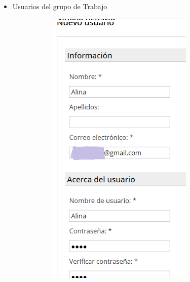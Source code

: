 \documentclass{article}
\begin{document}
\begin{itemize}
\item Usuarios del grupo de Trabajo
\begin{figure}[h!]
        \begin{subfigure}[!]{0.25\textwidth} 
            \includegraphics[width=\textwidth]{images/alina.png}

\end{subfigure}
\end{figure}
\end{itemize}
\end{document}

